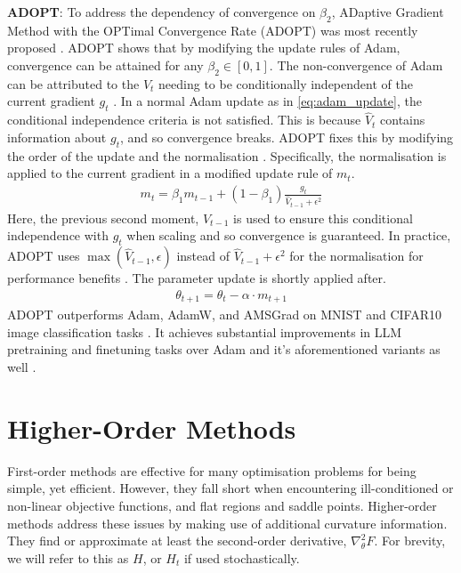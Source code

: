 \textbf{ADOPT}: To address the dependency of convergence on $\beta_2$, ADaptive Gradient Method with the OPTimal Convergence Rate (ADOPT) was most recently proposed \citep{taniguchi2024adopt}. ADOPT shows that by modifying the update rules of Adam, convergence can be attained for any $\beta_2 \in [0, 1]$. The non-convergence of Adam can be attributed to the $V_t$ needing to be conditionally independent of the current gradient $g_t$ \citep{taniguchi2024adopt}. In a normal Adam update as in \cref{eq:adam_update}, the conditional independence criteria is not satisfied. This is because $\hat{V}_t$ contains information about $g_t$, and so convergence breaks. 
ADOPT fixes this by modifying the order of the update and the normalisation \citep{taniguchi2024adopt}. Specifically, the normalisation is applied to the current gradient in a modified update rule of $m_t$.
\begin{align}
    m_t = \beta_1 m_{t-1} + (1 - \beta_1) \frac{g_t}{\hat{V}_{t-1} + \epsilon^2}
\end{align}
Here, the previous second moment, $V_{t-1}$ is used to ensure this conditional independence with $g_t$ when scaling and so convergence is guaranteed. In practice, ADOPT uses $\max(\hat{V}_{t-1}, \epsilon)$ instead of $\hat{V}_{t-1} + \epsilon^2$ for the normalisation for performance benefits \citep{taniguchi2024adopt}. The parameter update is shortly applied after.
\begin{align}
    \theta_{t+1} = \theta_{t} - \alpha \cdot m_{t+1}
\end{align}
ADOPT outperforms Adam, AdamW, and AMSGrad on MNIST and CIFAR10 image classification tasks \citep{taniguchi2024adopt}.
It achieves substantial improvements in LLM pretraining and finetuning tasks over Adam and it's aforementioned variants as well \citep{taniguchi2024adopt}. 

\section{Higher-Order Methods}
First-order methods are effective for many optimisation problems for being simple, yet efficient. However, they fall short when encountering ill-conditioned or non-linear objective functions, and flat regions and saddle points. Higher-order methods address these issues by making use of additional curvature information. They find or approximate at least the second-order derivative, $\nabla_{\theta}^{2}F$. For brevity, we will refer to this as $H$, or $H_t$ if used stochastically. 

